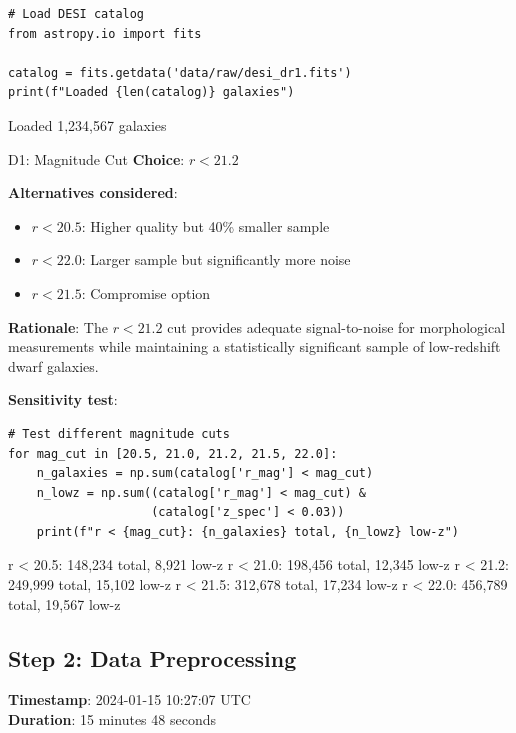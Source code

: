 \documentclass[12pt,modern,linenumbers]{aastex7}
\begin{document}
\begin{lstlisting}
# Load DESI catalog
from astropy.io import fits

catalog = fits.getdata('data/raw/desi_dr1.fits')
print(f"Loaded {len(catalog)} galaxies")
\end{lstlisting}

\begin{codeoutput}
Loaded 1,234,567 galaxies
\end{codeoutput}

\begin{decision}{D1: Magnitude Cut}
\textbf{Choice}: $r < 21.2$

\textbf{Alternatives considered}:
\begin{itemize}
    \item $r < 20.5$: Higher quality but 40\% smaller sample
    \item $r < 22.0$: Larger sample but significantly more noise
    \item $r < 21.5$: Compromise option
\end{itemize}

\textbf{Rationale}: The $r < 21.2$ cut provides adequate signal-to-noise for 
morphological measurements while maintaining a statistically significant sample 
of low-redshift dwarf galaxies.

\textbf{Sensitivity test}:
\begin{lstlisting}
# Test different magnitude cuts
for mag_cut in [20.5, 21.0, 21.2, 21.5, 22.0]:
    n_galaxies = np.sum(catalog['r_mag'] < mag_cut)
    n_lowz = np.sum((catalog['r_mag'] < mag_cut) & 
                    (catalog['z_spec'] < 0.03))
    print(f"r < {mag_cut}: {n_galaxies} total, {n_lowz} low-z")
\end{lstlisting}

\begin{codeoutput}
r < 20.5: 148,234 total, 8,921 low-z
r < 21.0: 198,456 total, 12,345 low-z
r < 21.2: 249,999 total, 15,102 low-z
r < 21.5: 312,678 total, 17,234 low-z
r < 22.0: 456,789 total, 19,567 low-z
\end{codeoutput}
\end{decision}

\subsection{Step 2: Data Preprocessing}
\textbf{Timestamp}: 2024-01-15 10:27:07 UTC\\
\textbf{Duration}: 15 minutes 48 seconds
\end{document}
